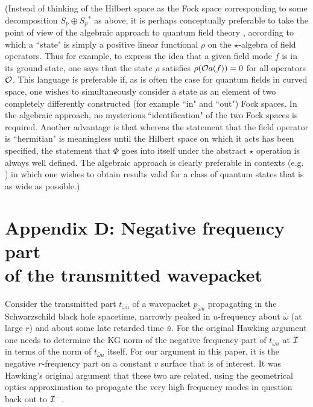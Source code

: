 \documentclass[12pt]{article}
\def\obar{\bar{\omega}}
\def\ubar{\bar{u}}
\def\pastI{{\cal I}^-}
\begin{document}
(Instead of thinking of the Hilbert space as the Fock space
corresponding to some decomposition $S_p\oplus S_p{}^*$ as
above, it is perhaps conceptually preferable to take the
point of view of the algebraic approach to quantum field
theory \cite{KayWald}, according to which a ``state" is
simply a positive
linear functional $\rho$ on the $\star$-algebra of field
operators. Thus for example, to express the idea that a
given field mode $f$ is in its ground state, one says that
the state $\rho$ satisfies $\rho({\cal O} a(f))=0$ for all
operators ${\cal O}$. This language is preferable if, as is
often the case for quantum fields in curved space, one
wishes to simultaneously consider a state as an element of
two completely differently constructed (for example ``in" and
``out") Fock spaces. In the
algebraic approach, no mysterious ``identification" of the
two Fock spaces is required. Another advantage is that
whereas the statement that the field operator is ``hermitian" is
meaningless until the Hilbert space on which it acts has
been specified, the statement that $\Phi$ goes into itself
under the abstract $\star$ operation is always well defined.
The algebraic approach is clearly preferable in
contexts (e.g. \cite{KayWald,WaldYurt}) in which one wishes to
obtain results valid for a class of quantum states that is
as wide as possible.)

\section*{Appendix D: Negative frequency part \\
of the transmitted wavepacket}

Consider the transmitted part $t_{\obar\ubar}$ of a
wavepacket $p_{\obar\ubar}$ propagating in the
Schwarzschild black hole spacetime, narrowly peaked in
$u$-frequency about $\obar$ (at large $r$)
and about some late retarded
time $\ubar$. For the original Hawking argument one needs to
determine the KG norm of the negative frequency part of
$t_{\obar\ubar}$ at $\pastI$ in terms of the norm of
$t_{\obar\ubar}$ itself. For our argument in this paper,
it is the negative $r$-frequency part on a constant $v$ surface
that is of interest. It was Hawking's original argument that
these two are related, using the geometrical optics
approximation to propagate the very high frequency modes in
question back out to $\pastI$.
\end{document}
